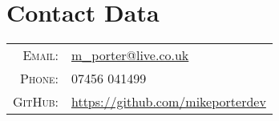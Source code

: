 \section{Contact Data}

\begin{tabular}{rl}
    \textsc{Email:}     & \href{mailto:m_porter@live.co.uk}{m\_porter@live.co.uk} \\
    \textsc{Phone:}		& 07456 041499 \\
    \textsc{GitHub:}	& \href{https://github.com/mikeporterdev/}{https://github.com/mikeporterdev} 
\end{tabular}